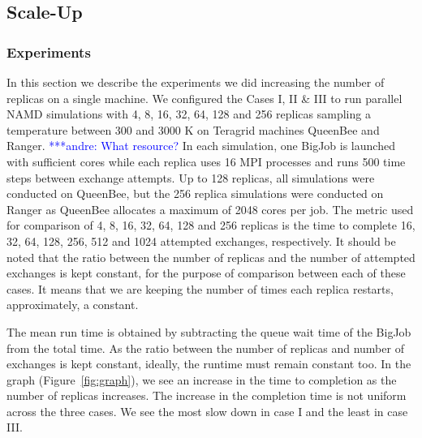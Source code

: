 \documentclass{rspublic}
\newcommand{\alnote}[1]{ {\textcolor{blue} { ***andre: #1 }}}
\newcommand{\alnote}[1]{}
\begin{document}


\subsection{Scale-Up}

\subsubsection{Experiments}
In this section we describe the experiments we did increasing the number of replicas on a single machine. We configured the Cases I, II \& III to run parallel NAMD simulations with 4, 8, 16, 32, 64, 128 and 256 replicas sampling a temperature between 300 and 3000 K on Teragrid machines QueenBee and Ranger. \alnote{What resource?} In each simulation, one BigJob is launched with sufficient cores while each replica uses 16 MPI processes and runs 500 time steps between exchange attempts. Up to 128 replicas, all simulations were conducted on QueenBee, but the 256 replica simulations were conducted on Ranger as QueenBee allocates a maximum of 2048 cores per job. The metric used for comparison of 4, 8, 16, 32, 64, 128 and 256 replicas is the time to complete 16, 32, 64, 128, 256, 512 and 1024 attempted exchanges, respectively. It should be noted that the ratio between the number of replicas and the number of attempted exchanges is kept constant, for the purpose of comparison between each of these cases. It means that we are keeping the number of times each replica restarts, approximately, a constant. 

The mean run time is obtained by subtracting the queue wait time of the BigJob from the total time. As the ratio between the number of replicas and number of exchanges is kept constant, ideally, the runtime must remain constant too. In the graph (Figure~\ref{fig:graph}), we see an increase in the time to completion as the number of replicas increases. The increase in the completion time is not uniform across the three cases. We see the most slow down in case I and the least in case III.
\end{document}
